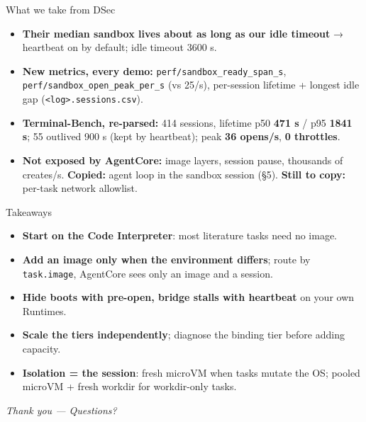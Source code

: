 \documentclass[
  10pt,
  ignorenonframetext,
  aspectratio=169,
  t]{beamer}
\providecommand{\tightlist}{%
  \setlength{\itemsep}{0pt}\setlength{\parskip}{0pt}}
\begin{document}
\begin{frame}{What we take from DSec}
\protect\hypertarget{what-we-take-from-dsec}{}
\begin{itemize}
\tightlist
\item
  \textbf{Their median sandbox lives about as long as our idle timeout}
  → heartbeat on by default; idle timeout 3600 s.
\item
  \textbf{New metrics, every demo:}
  \texttt{perf/sandbox\_ready\_span\_s},
  \texttt{perf/sandbox\_open\_peak\_per\_s} (vs 25/s), per-session
  lifetime + longest idle gap
  (\texttt{\textless{}log\textgreater{}.sessions.csv}).
\item
  \textbf{Terminal-Bench, re-parsed:} 414 sessions, lifetime p50
  \textbf{471 s} / p95 \textbf{1841 s}; 55 outlived 900 s (kept by
  heartbeat); peak \textbf{36 opens/s}, \textbf{0 throttles}.
\item
  \textbf{Not exposed by AgentCore:} image layers, session pause,
  thousands of creates/s. \textbf{Copied:} agent loop in the sandbox
  session (§5). \textbf{Still to copy:} per-task network allowlist.
\end{itemize}
\end{frame}

\begin{frame}{Takeaways}
\protect\hypertarget{takeaways}{}
\begin{itemize}
\tightlist
\item
  \textbf{Start on the Code Interpreter}: most literature tasks need no
  image.
\item
  \textbf{Add an image only when the environment differs}; route by
  \texttt{task.image}, AgentCore sees only an image and a session.
\item
  \textbf{Hide boots with pre-open, bridge stalls with heartbeat} on
  your own Runtimes.
\item
  \textbf{Scale the tiers independently}; diagnose the binding tier
  before adding capacity.
\item
  \textbf{Isolation = the session}: fresh microVM when tasks mutate the
  OS; pooled microVM + fresh workdir for workdir-only tasks.
\end{itemize}
\end{frame}

\begin{frame}
\emph{Thank you --- Questions?}
\end{frame}
\end{document}
